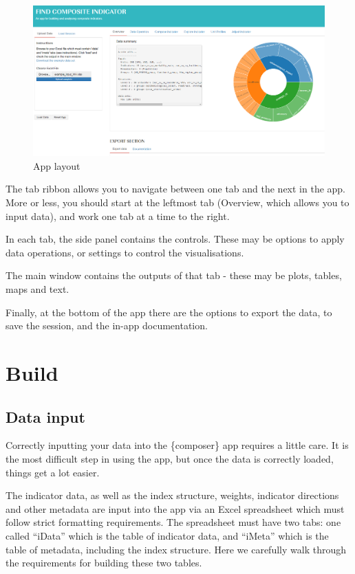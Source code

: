 \documentclass[
  letterpaper,
  DIV=11,
  numbers=noendperiod]{scrreprt}
\begin{document}
\begin{figure}

{\centering \includegraphics[width=1\textwidth,height=\textheight]{figs/app_layout.png}

}

\caption{App layout}

\end{figure}

The tab ribbon allows you to navigate between one tab and the next in
the app. More or less, you should start at the leftmost tab (Overview,
which allows you to input data), and work one tab at a time to the
right.

In each tab, the side panel contains the controls. These may be options
to apply data operations, or settings to control the visualisations.

The main window contains the outputs of that tab - these may be plots,
tables, maps and text.

Finally, at the bottom of the app there are the options to export the
data, to save the session, and the in-app documentation.

\part{Build}

\hypertarget{sec-datainput}{%
\chapter{Data input}\label{sec-datainput}}

Correctly inputting your data into the \{composer\} app requires a
little care. It is the most difficult step in using the app, but once
the data is correctly loaded, things get a lot easier.

The indicator data, as well as the index structure, weights, indicator
directions and other metadata are input into the app via an Excel
spreadsheet which must follow strict formatting requirements. The
spreadsheet must have two tabs: one called ``iData'' which is the table
of indicator data, and ``iMeta'' which is the table of metadata,
including the index structure. Here we carefully walk through the
requirements for building these two tables.
\end{document}
